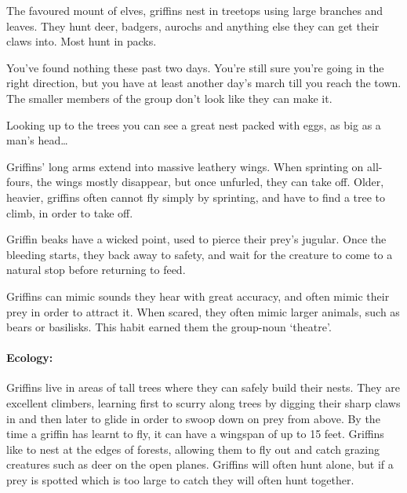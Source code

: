 \begin{multicols}{2}
\label{griffin}

The favoured mount of elves, griffins nest in treetops using large branches and leaves.
They hunt deer, badgers, aurochs and anything else they can get their claws into.
Most hunt in packs.

\begin{boxtext}

  You've found nothing these past two days.
  You're still sure you're going in the right direction, but you have at least another day's march till you reach the town.
  The smaller members of the group don't look like they can make it.

  Looking up to the trees you can see a great nest packed with eggs, as big as a man's head\ldots

\end{boxtext}

Griffins' long arms extend into massive leathery wings.
When sprinting on all-fours, the wings mostly disappear, but once unfurled, they can take off.
Older, heavier, griffins often cannot fly simply by sprinting, and have to find a tree to climb, in order to take off.

Griffin beaks have a wicked point, used to pierce their prey's jugular.
Once the bleeding starts, they back away to safety, and wait for the creature to come to a natural stop before returning to feed.

Griffins can mimic sounds they hear with great accuracy, and often mimic their prey in order to attract it.
When scared, they often mimic larger animals, such as bears or basilisks.
This habit earned them the group-noun `theatre'.


\paragraph{Ecology:} Griffins live in areas of tall trees where they can safely build their nests.
They are excellent climbers, learning first to scurry along trees by digging their sharp claws in and then later to glide in order to swoop down on prey from above.
By the time a griffin has learnt to fly, it can have a wingspan of up to 15 feet.
Griffins like to nest at the edges of forests, allowing them to fly out and catch grazing creatures such as deer on the open planes.
Griffins will often hunt alone, but if a prey is spotted which is too large to catch  they will often hunt together.


\end{multicols}
